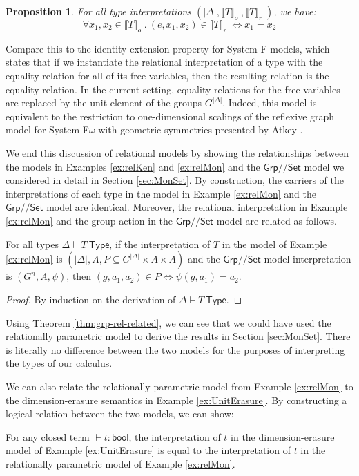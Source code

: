 \documentclass[a4paper,UKenglish]{lipics}
\newtheorem{proposition}[theorem]{Proposition}
\newcommand{\msf}[1]{\mathsf{#1}} %
\newcommand{\Grp}{\msf{Grp}}
\newcommand{\Set}{\msf{Set}}
\newcommand{\Lslice}[1]{#1/\!/\Set}
\newcommand{\GrpSet}{\Lslice{\Grp}}
\newcommand{\semo}[1]{\ensuremath{\llbracket #1 \rrbracket _o} \;}
\newcommand{\semr}[1]{\ensuremath{\llbracket #1 \rrbracket _r} \;}
\begin{document}
\begin{example}
  \begin{proposition}
For all type interpretations $(|\Delta|, \semo{T}, \semr{T})$, we have:
\begin{displaymath} \forall x_1, x_2 \in \semo{T}.~(e,x_1,x_2) \in \semr{T} \Leftrightarrow x_1 = x_2
\end{displaymath}
  \end{proposition}
  Compare this to the identity extension property for System F models,
  which states that if we instantiate the relational interpretation of
  a type with the equality relation for all of its free variables,
  then the resulting relation is the equality relation. In the current
  setting, equality relations for the free variables are replaced by
  the unit element of the groups $G^{|\Delta|}$. Indeed, this model is
  equivalent to the restriction to one-dimensional scalings of the
  reflexive graph model for System F$\omega$ with geometric symmetries
  presented by Atkey \cite{atkey14conservation}.
\end{example}

We end this discussion of relational models by showing the
relationships between the models in Examples \ref{ex:relKen} and
\ref{ex:relMon} and the $\GrpSet$ model we considered in detail in
Section \ref{sec:MonSet}. By construction, the carriers of the
interpretations of each type in the model in Example \ref{ex:relMon}
and the $\GrpSet$ model are identical. Moreover, the relational
interpretation in Example \ref{ex:relMon} and the group action in the
$\GrpSet$ model are related as follows.
\begin{theorem}\label{thm:grp-rel-related}
  For all types $\Delta \vdash T~\msf{Type}$, if the interpretation of
  $T$ in the model of Example \ref{ex:relMon} is $(|\Delta|, A, P
  \subseteq G^{|\Delta|} \times A \times A)$ and the $\GrpSet$ model
  interpretation is $(G^n, A, \psi)$, then $(g, a_1, a_2) \in P
  \Leftrightarrow \psi(g,a_1) = a_2$.
\end{theorem}
\begin{proof}
  By induction on the derivation of $\Delta \vdash T~\msf{Type}$.
\end{proof}

Using Theorem \ref{thm:grp-rel-related}, we can see that we could have
used the relationally parametric model to derive the results in
Section \ref{sec:MonSet}. There is literally no difference between the
two models for the purposes of interpreting the types of our calculus.

We can also relate the relationally parametric model from Example
\ref{ex:relMon} to the dimension-erasure semantics in Example
\ref{ex:UnitErasure}. By constructing a logical relation between the
two models, we can show:
\begin{theorem}\label{thm:closed-prog-equiv}
  For any closed term $\vdash t : \msf{bool}$, the interpretation of
  $t$ in the dimension-erasure model of Example \ref{ex:UnitErasure}
  is equal to the interpretation of $t$ in the relationally parametric
  model of Example \ref{ex:relMon}.
\end{theorem}
\end{document}
